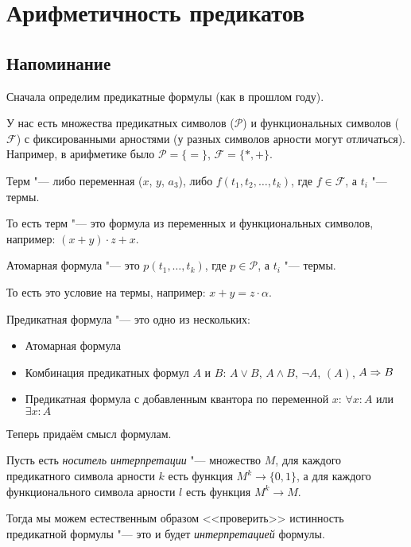 \section{Арифметичность предикатов}
\subsection{Напоминание}
Сначала определим предикатные формулы (как в прошлом году).

У нас есть множества предикатных символов ($\mathcal P$) и функциональных символов ($\mathcal F$) с фиксированными арностями
(у разных символов арности могут отличаться).
Например, в арифметике было $\mathcal P = \{ = \}$, $\mathcal F = \{ *, + \}$.
\begin{Def}
	Терм "--- либо переменная ($x$, $y$, $a_{3}$), либо $f(t_1, t_2, \dots, t_k)$, где $f \in \mathcal F$, а $t_i$ "--- термы.

	То есть терм "--- это формула из переменных и функциональных символов, например: $(x+y) \cdot z + x$.
\end{Def}
\begin{Def}
	Атомарная формула "--- это $p(t_1, \dots, t_k)$, где $p \in \mathcal P$, а $t_i$ "--- термы.

	То есть это условие на термы, например: $x+y=z\cdot \alpha$.
\end{Def}
\begin{Def}
	Предикатная формула "--- это одно из нескольких:
	\begin{itemize}
		\item Атомарная формула
		\item Комбинация предикатных формул $A$ и $B$: $A \lor B$, $A \land B$, $\lnot A$, $(A)$, $A \Rightarrow B$
		\item Предикатная формула с добавленным квантора по переменной $x$: $\forall x \colon A$ или $\exists x \colon A$
	\end{itemize}
\end{Def}

Теперь придаём смысл формулам.
\begin{Def}
	Пусть есть \textit{носитель интерпретации} "--- множество $M$,
	для каждого предикатного символа арности $k$ есть функция $M^k \to \{ 0, 1 \}$,
	а для каждого функционального символа арности $l$ есть функция $M^k \to M$.

	Тогда мы можем естественным образом <<проверить>> истинность предикатной формулы "--- это и будет \textit{интерпретацией} формулы.
\end{Def}

